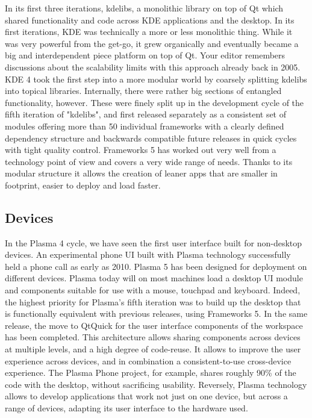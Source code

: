 In its first three iterations, kdelibs, a monolithic library on top of Qt which shared functionality and code across KDE applications and the desktop. In its first iterations, KDE was technically a more or less monolithic thing. While it was very powerful from the get-go, it grew organically and eventually became a big and interdependent piece platform on top of Qt. Your editor remembers discussions about the scalability limits with this approach already back in 2005. KDE 4 took the first step into a more modular world by coarsely splitting kdelibs into topical libraries. Internally, there were rather big sections of entangled functionality, however. These were finely split up in the development cycle of the fifth iteration of "kdelibs", and first released separately as a consistent set of modules offering more than 50 individual frameworks with a clearly defined dependency structure and backwards compatible future releases in quick cycles with tight quality control. Frameworks 5 has worked out very well from a technology point of view and covers a very wide range of needs. Thanks to its modular structure it allows the creation of leaner apps that are smaller in footprint, easier to deploy and load faster.

\subsection*{Devices}

In the Plasma 4 cycle, we have seen the first user interface built for non-desktop devices. An experimental phone UI built with Plasma technology successfully held a phone call as early as 2010. Plasma 5 has been designed for deployment on different devices. Plasma today will on most machines load a desktop UI module and components suitable for use with a mouse, touchpad and keyboard.
Indeed, the highest priority for Plasma's fifth iteration was to build up the desktop that is functionally equivalent with previous releases, using Frameworks 5. In the same release, the move to QtQuick for the user interface components of the workspace has been completed.
This architecture allows sharing components across devices at multiple levels, and a high degree of code-reuse. It allows to improve the user experience across devices, and in combination a consistent-to-use cross-device experience. The Plasma Phone project, for example, shares roughly 90\% of the code with the desktop, without sacrificing usability.
Reversely, Plasma technology allows to develop applications that work not just on one device, but across a range of devices, adapting its user interface to the hardware used.

